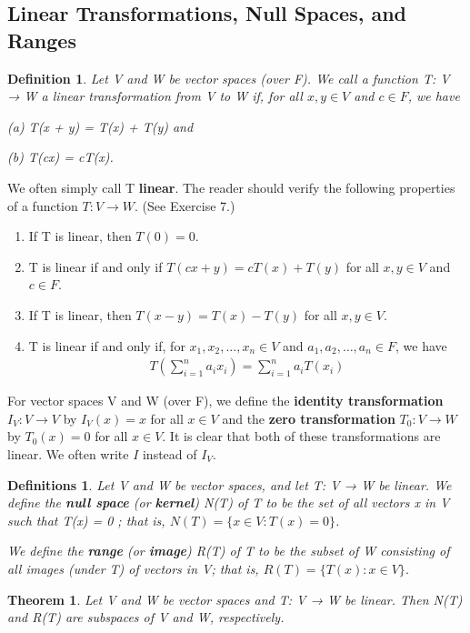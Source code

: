 \documentclass{article}
\newcommand{\bd}[1]{\textbf{#1}}
\theoremstyle{plain}
\newtheorem{theorem}{Theorem}[section]
\newtheorem*{definition1}{Definition}
\newtheorem*{definitions}{Definitions}
\theoremstyle{plain} %
\begin{document}
\subsection{Linear Transformations, Null Spaces, and Ranges}

\begin{definition1}
Let V and W be vector spaces (over F). We call a function T: V → W a linear transformation from V to W if, for all $x, y \in V$ and $c \in F$, we have

(a) T(x + y) = T(x) + T(y) and

(b) T(cx) = cT(x).
\end{definition1}

We often simply call T \bd{linear}. The reader should verify the following properties of a function $T: V \to W$. (See Exercise 7.)
\begin{enumerate}
\item If T is linear, then $T(0) = 0$.
\item T is linear if and only if $T(cx + y) = cT(x) + T(y)$ for all $x, y \in V$ and
$c \in F$.
\item If T is linear, then $T(x − y) = T(x) − T(y)$ for all $x, y \in V$.
\item T is linear if and only if, for $x_1, x_2,... ,x_n \in V$ and $a_1, a_2, \ldots ,a_n \in F$, we have 
\begin{align*}
T\left(\sum_{i=1}^n a_ix_i\right)=\sum_{i=1}^n a_iT(x_i)
\end{align*}
\end{enumerate}

For vector spaces V and W (over F), we define the \bd{identity transformation} $I_V : V \to V$ by $I_V(x) = x$ for all $x \in V$ and the \bd{zero transformation} $T_0 : V \to W$ by $T_0(x) = 0$ for all $x \in V$. It is clear that both of these transformations are linear. We often write $I$ instead of $I_V$.

\begin{definitions}
Let V and W be vector spaces, and let T: V → W be linear.
We define the \bd{null space} (or \bd{kernel}) N(T) of T to be the set of all vectors x in V such that T(x) = 0 ; that is, $N(T) = \{x \in V: T(x) = 0 \}$.

We define the \bd{range} (or \bd{image}) R(T) of T to be the subset of W consisting of all images (under T) of vectors in V; that is, $R(T) = \{T(x): x \in V\}$.
\end{definitions}

\begin{theorem}
Let V and W be vector spaces and T: V → W be linear. Then N(T) and R(T) are subspaces of V and W, respectively.
\end{theorem}
\end{document}
